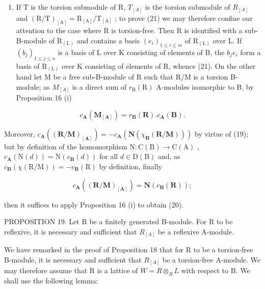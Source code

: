 \begin{enumerate}
\def\labelenumi{(\roman{enumi})}
\setcounter{enumi}{2}
\tightlist
\item
  If T is the torsion submodule of R, \(T_{[A]}\) is the torsion submodule of \(R_{[A]}\) and \((\mathrm{R}/\mathrm{T})_{[\mathrm{A}]} = \mathrm{R}_{[\mathrm{A}]}/\mathrm{T}_{[\mathrm{A}]}\) ; to prove (21) we may therefore confine our attention to the case where R is torsion-free. Then R is identified with a sub-B-module of \(\mathrm{R}_{(\mathrm{L})}\) and contains a basis \((e_{i})_{1 \leqslant i \leqslant m}\) of \(\mathrm{R}_{(\mathrm{L})}\) over L. If \((b_{j})_{1 \leqslant j \leqslant n}\) is a basis of L over K consisting of elements of B, the \(b_{j}e_{i}\) form a basis of \(\mathrm{R}_{(\mathrm{L})}\) over K consisting of elements of R, whence (21). On the other hand let M be a free sub-B-module of R such that R/M is a torsion B-module; as \(M_{[A]}\) is a direct sum of \(r_{\mathrm{B}}(\mathrm{R})\) A-modules isomorphic to B, by Proposition 16 (i)
\end{enumerate}

\[
c _ {\mathbf {A}} (\mathbf {M} _ {[ \mathbf {A} ]}) = r _ {\mathbf {B}} (\mathbf {R}). c _ {\mathbf {A}} (\mathbf {B}).
\]

Moreover, \(c_{\mathbf{A}}((\mathbf{R} / \mathbf{M})_{[\mathbf{A}]})=-c_{\mathbf{A}}(\mathbf{N}(\chi_{\mathbf{B}}(\mathbf{R} / \mathbf{M})))\) by virtue of (19); but by definition of the homomorphism \(\mathrm{N}\colon\mathrm{C}(\mathrm{B})\to\mathrm{C}(\mathrm{A})\) , \(c_{\mathbf{A}}(\mathrm{N}(d))=\mathrm{N}(c_{\mathbf{B}}(d))\) for all \(d\in\mathrm{D}(\mathrm{B})\) and, as \(c_{\mathbf{B}}(\chi(\mathrm{R}/\mathrm{M}))=-c_{\mathbf{B}}(\mathrm{R})\) by definition, finally

\[
c _ {\mathbf {A}} ((\mathbf {R} / \mathbf {M}) _ {[ \mathbf {A} ]}) = \mathbf {N} (c _ {\mathbf {B}} (\mathbf {R}));
\]

then it suffices to apply Proposition 16 (i) to obtain (20).

PROPOSITION 19. Let R be a finitely generated B-module. For R to be reflexive, it is necessary and sufficient that \(R_{[A]}\) be a reflexive A-module.

We have remarked in the proof of Proposition 18 that for R to be a torsion-free B-module, it is necessary and sufficient that \(R_{[A]}\) be a torsion-free A-module. We may therefore assume that R is a lattice of \(W = R \otimes_{B} L\) with respect to B. We shall use the following lemma:


